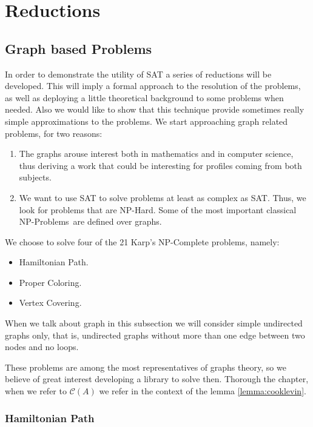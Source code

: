 \section{Reductions}
\subsection{Graph based Problems}
In order to demonstrate the utility of SAT a series of reductions will be developed. This will imply a formal approach to the resolution of the problems, as well as deploying a little theoretical background to some problems when needed. Also we would like to show that this technique provide sometimes really simple approximations to the problems. We start approaching graph related problems, for two reasons:

\begin{enumerate}
\item The graphs arouse interest both in mathematics and in computer science, thus deriving a work that could be interesting for profiles coming from both subjects.
\item We want to use SAT to solve problems at least as complex as SAT. Thus, we look for problems that are NP-Hard. Some of the most important classical NP-Problems\ are defined over graphs. 
\end{enumerate}



 
We choose to solve four of the 21 Karp's NP-Complete problems\cite{karp1972reducibility}, namely:
\begin{itemize}
\item Hamiltonian Path.
\item Proper Coloring.
\item Vertex Covering.
\end{itemize}

When we talk about graph in this subsection we will consider simple undirected graphs only, that is, undirected graphs without more than one edge between two nodes and no loops.

These problems are among the most representatives of graphs theory, so we believe of great interest developing a library to solve then. Thorough the chapter, when we refer to $\mathcal{C}(A)$ we refer in the context of the lemma \ref{lemma:cooklevin}.


\subsubsection{Hamiltonian Path}

